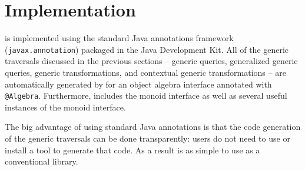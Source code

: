 \section{\name Implementation}

\name is implemented using the standard Java annotations framework
(\lstinline{javax.annotation}) packaged in the Java Development Kit.
All of the generic traversals discussed in the previous sections --
generic queries, generalized generic queries, generic transformations,
and contextual generic transformations -- are automatically generated
by \name for an object algebra interface annotated with \lstinline{@Algebra}.
Furthermore, \name includes the monoid interface as well as several
useful instances of the monoid interface.

The big advantage of using standard Java annotations is that the code 
generation of the generic traversals can be done transparently: users 
do not need to use or install a tool to generate that code. As a
result \name is as simple to use as a conventional library. 
\begin{comment}
Another advantage of \name is that it is quite easy to extend with new 
types of traversals.
\bruno{Say something about this}

\tijs{It's this many SLOC:  885}
\bruno{Should we talk about code size? How big is the \name framework?} 
\end{comment}
